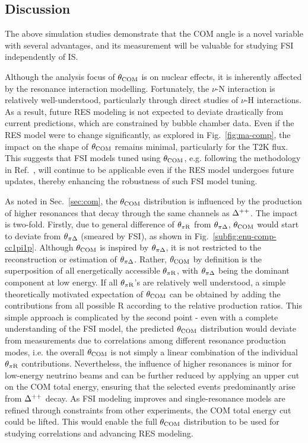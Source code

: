      \subsection{Discussion}
     \label{sec:dis}
     The above simulation studies demonstrate that the COM angle is a novel variable with several advantages, and its measurement will be valuable for studying FSI independently of IS.

     Although the analysis focus of $\theta_{\textrm{COM}}$ is on nuclear effects, it is inherently affected by the resonance interaction modelling. 
     Fortunately, the $\nu$-N interaction is relatively well-understood, particularly through direct studies of $\nu$-H interactions. 
     As a result, future RES modeling is not expected to deviate drastically from current predictions, which are constrained by bubble chamber data.
     Even if the RES model were to change significantly, as explored in Fig.~\ref{fig:ma-comp}, the impact on the shape of $\theta_{\textrm{COM}}$ remains minimal, particularly for the T2K flux.
     This suggests that FSI models tuned using $\theta_{\textrm{COM}}$, e.g. following the methodology in Ref.~\cite{GENIE:2021zuu}, will continue to be applicable even if the RES model undergoes future updates, thereby enhancing the robustness of such FSI model tuning.

     As noted in Sec.~\ref{sec:com}, the $\theta_{\textrm{COM}}$ distribution is influenced by the production of higher resonances that decay through the same channels as $\Delta^{++}$.
     The impact is two-fold.
     Firstly, due to general difference of $\theta_{\pi\textrm{R}}$ from $\theta_{\pi\Delta}$, $\theta_{\textrm{COM}}$ would start to deviate from $\theta_{\pi\Delta}$ (smeared by FSI), as shown in Fig.~\ref{subfig:enu-comp-cc1pi1p}. 
     Although $\theta_{\textrm{COM}}$ is inspired by $\theta_{\pi\Delta}$, it is not restricted to the reconstruction or estimation of $\theta_{\pi\Delta}$. 
     Rather, $\theta_{\textrm{COM}}$ by definition is the superposition of all energetically accessible $\theta_{\pi\textrm{R}}$, with $\theta_{\pi\Delta}$ being the dominant component at low energy.
     If all $\theta_{\pi\textrm{R}}$'s are relatively well understood, a simple theoretically motivated expectation of $\theta_{\textrm{COM}}$ can be obtained by adding the contributions from all possible R according to the relative production ratios.
     This simple approach is complicated by the second point - even with a complete understanding of the FSI model, the predicted $\theta_{\textrm{COM}}$ distribution would deviate from measurements due to correlations among different resonance production modes, i.e. the overall $\theta_{\textrm{COM}}$ is not simply a linear combination of the individual $\theta_{\pi\textrm{R}}$ contributions.
     Nevertheless, the influence of higher resonances is minor for low-energy neutrino beams and can be further reduced by applying an upper cut on the COM total energy, ensuring that the selected events predominantly arise from $\Delta^{++}$ decay.
     As FSI modeling improves and single-resonance models are refined through constraints from other experiments, the COM total energy cut could be lifted. 
     This would enable the full $\theta_{\textrm{COM}}$ distribution to be used for studying correlations and advancing RES modeling.

